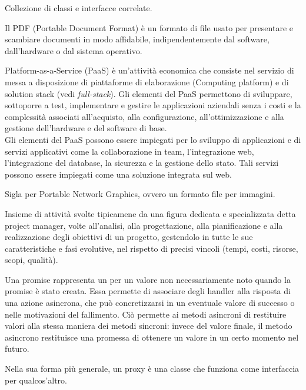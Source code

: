 Collezione di classi e interfacce correlate.

Il PDF (Portable Document Format) è un formato di file usato per presentare e scambiare documenti in modo affidabile, indipendentemente dal software, dall'hardware o dal sistema operativo.

Platform-as-a-Service (PaaS) è un'attività economica che consiste nel servizio di messa a disposizione di piattaforme di elaborazione (Computing platform) e di solution stack (vedi \textit{full-stack}). Gli elementi del PaaS permettono di sviluppare, sottoporre a test, implementare e gestire le applicazioni aziendali senza i costi e la complessità associati all'acquisto, alla configurazione, all'ottimizzazione e alla gestione dell'hardware e del software di base.\\
Gli elementi del PaaS possono essere impiegati per lo sviluppo di applicazioni e di servizi applicativi come la collaborazione in team, l'integrazione web, l'integrazione del database, la sicurezza e la gestione dello stato. Tali servizi possono essere impiegati come una soluzione integrata sul web.

Sigla per Portable Network Graphics, ovvero un formato file per immagini.

Insieme di attività svolte tipicamene da una figura dedicata e specializzata detta project manager, volte all'analisi, alla progettazione, alla pianificazione e alla realizzazione degli obiettivi di un progetto, gestendolo in tutte le sue caratteristiche e fasi evolutive, nel rispetto di precisi vincoli (tempi, costi, risorse, scopi, qualità).

Una promise rappresenta un  per un valore non necessariamente noto quando la promise è stato creata. Essa permette di associare degli handler alla risposta di una azione asincrona, che può concretizzarsi in un eventuale valore di successo o nelle motivazioni del fallimento. Ciò permette ai metodi asincroni di restituire valori alla stessa maniera dei metodi sincroni: invece del valore finale, il metodo asincrono restituisce una promessa di ottenere un valore in un certo momento nel futuro.

Nella sua forma più generale, un proxy è una classe che funziona come interfaccia per qualcos'altro.
\clearpage